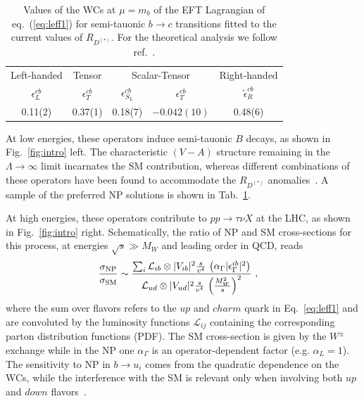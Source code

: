 \documentclass[%
 reprint,
 superscriptaddress,preprintnumbers,
 amsmath,amssymb,
 aps,
]{revtex4-1}
\begin{document}
\begin{table}[h]
\caption{Values of the WCs at $\mu=m_b$ of the EFT Lagrangian of eq.~(\ref{eq:leff1}) for semi-tauonic $b\to c$ transitions fitted to the current values of $R_{D^{(*)}}$. For the theoretical analysis we follow ref.~\cite{Alonso:2016gym}.  \label{tab:RDsFit}}
\begin{tabular}{ccccc}
\hline\hline
Left-handed& Tensor &\multicolumn{2}{c}{Scalar-Tensor}&Right-handed\\

$\epsilon_L^{cb}$& $\epsilon_T^{cb}$&  $\epsilon_{S_L}^{cb}$&$\epsilon_T^{cb}$&$\tilde\epsilon_R^{cb}$\\
\hline
0.11(2)&0.37(1)&0.18(7)&$-0.042(10)$&0.48(6)\\
\hline\hline
\end{tabular}
\end{table}

At low energies, these operators induce semi-tauonic $B$ decays, as shown in Fig.~\ref{fig:intro} left. The characteristic $(V-A)$ structure remaining in the $\Lambda\to\infty$ limit incarnates the SM contribution, whereas different combinations of these operators have been found to accommodate the $R_{D^{(*)}}$ anomalies~\cite{Freytsis:2015qca,Bhattacharya:2018kig,Robinson:2018gza}. A sample of the preferred NP solutions is shown in Tab.~\ref{tab:RDsFit}.    

At high energies, these operators contribute to $p p \to \tau \nu X$ at the LHC, as shown in Fig.~\ref{fig:intro} right. Schematically, the ratio of NP and SM cross-sections for this process, at energies $\sqrt{s}\gg M_W$ and  leading order in QCD, reads
\begin{align}
\frac{\sigma_{\rm{NP}}}{\sigma_{\rm{SM}}} &\sim \frac{\sum_i\mathcal L_{ib}\otimes|V_{ib}|^2\frac{s}{v^4}\, \left( \alpha_\Gamma|\epsilon_\Gamma^{i b}|^2 \right)}{\mathcal L_{u d}\otimes|V_{u d}|^2\frac{s}{v^4}\, \left(\frac{M_W^2}{s}\right)^2}~,\label{eq:xsec_scheme}
\end{align}
where the sum over flavors refers to the $up$ and $charm$ quark in Eq.~\ref{eq:leff1} and are convoluted by the luminosity functions $\mathcal L_{ij}$ containing the corresponding parton distribution functions (PDF). The SM cross-section is given by the $W^\pm$ exchange while in the NP one $\alpha_\Gamma$ is an operator-dependent factor (e.g. $\alpha_L = 1$). The sensitivity to NP in $b \to u_i$ comes from the quadratic dependence on the WCs, while the interference with the SM is relevant only when involving both $up$ and $down$ flavors~\cite{Bhattacharya:2011qm,Cirigliano:2018dyk}.
\end{document}
